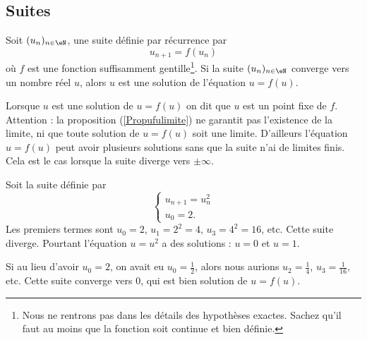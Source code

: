 
\subsection{Suites}

\begin{proposition}		\label{Propufulimite}
	Soit $(u_n)_{n\in\eN}$, une suite définie par récurrence par
	\begin{equation}
		u_{n+1}=f(u_n)
	\end{equation}
	où $f$ est une fonction suffisamment gentille\footnote{Nous ne rentrons pas dans les détails des hypothèses exactes. Sachez qu'il faut au moins que la fonction soit continue et bien définie.}. Si la suite $(u_n)_{n\in\eN}$ converge vers un nombre réel $u$, alors $u$ est une solution de l'équation  $u=f(u)$.
\end{proposition}
Lorsque $u$ est une solution de $u=f(u)$ on dit que $u$ est un point fixe de $f$. Attention : la proposition (\ref{Propufulimite}) ne garantit pas l'existence de la limite, ni que toute solution de $u=f(u)$ soit une limite. D'ailleurs l'équation $u=f(u)$ peut avoir plusieurs solutions sans que la suite n'ai de limites finis. Cela est le cas lorsque la suite diverge vers $\pm\infty$.

 \begin{example}
	 Soit la suite définie par
	 \begin{equation}
		 \begin{cases}
		 u_{n+1}=u_n^2\\
		u_0=2.
		 \end{cases}
	 \end{equation}
	 Les premiers termes sont $u_0=2$, $u_1=2^2=4$, $u_3=4^2=16$, etc. Cette suite diverge. Pourtant l'équation $u=u^2$ a des solutions : $u=0$ et $u=1$.

	 Si au lieu d'avoir $u_0=2$, on avait eu $u_0=\frac{ 1 }{2}$, alors nous aurions $u_2=\frac{ 1 }{ 4 }$, $u_3=\frac{1}{ 16 }$, etc. Cette suite converge vers $0$, qui est bien solution de $u=f(u)$.
\end{example}

